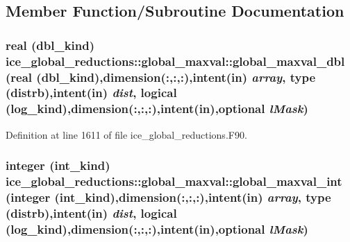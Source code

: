 \subsection{Member Function/Subroutine Documentation}
\hypertarget{interfaceice__global__reductions_1_1global__maxval_a4a852ac21171141c89954b1c8fe1e2d1}{
\subsubsection[{global\_\-maxval\_\-dbl}]{\setlength{\rightskip}{0pt plus 5cm}real (dbl\_\-kind) ice\_\-global\_\-reductions::global\_\-maxval::global\_\-maxval\_\-dbl (real (dbl\_\-kind),dimension(:,:,:),intent(in) {\em array}, \/  type ({\bf distrb}),intent(in) {\em dist}, \/  logical (log\_\-kind),dimension(:,:,:),intent(in),optional {\em lMask})}}
\label{interfaceice__global__reductions_1_1global__maxval_a4a852ac21171141c89954b1c8fe1e2d1}


Definition at line 1611 of file ice\_\-global\_\-reductions.F90.\hypertarget{interfaceice__global__reductions_1_1global__maxval_a908c45ec48e81cd70fdbc878f1c9864d}{
\subsubsection[{global\_\-maxval\_\-int}]{\setlength{\rightskip}{0pt plus 5cm}integer (int\_\-kind) ice\_\-global\_\-reductions::global\_\-maxval::global\_\-maxval\_\-int (integer (int\_\-kind),dimension(:,:,:),intent(in) {\em array}, \/  type ({\bf distrb}),intent(in) {\em dist}, \/  logical (log\_\-kind),dimension(:,:,:),intent(in),optional {\em lMask})}}
\label{interfaceice__global__reductions_1_1global__maxval_a908c45ec48e81cd70fdbc878f1c9864d}


